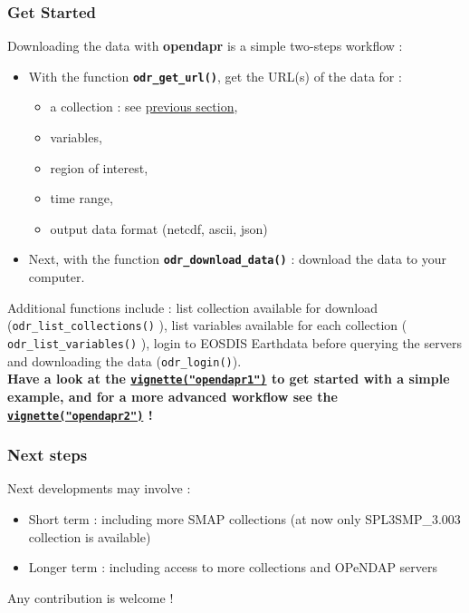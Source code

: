 \documentclass[12pt,twoside]{reedthesis}
\providecommand{\tightlist}{%
  \setlength{\itemsep}{0pt}\setlength{\parskip}{0pt}}
\begin{document}
\hypertarget{get-started}{%
\subsubsection{Get Started}\label{get-started}}

Downloading the data with \textbf{opendapr} is a simple two-steps workflow :
\begin{itemize}
\item
  With the function \textbf{\texttt{odr\_get\_url()}}, get the URL(s) of the data for :
  \begin{itemize}
  \tightlist
  \item
    a collection : see \protect\hyperlink{collections-available-in-opendapr}{previous section},
  \item
    variables,
  \item
    region of interest,
  \item
    time range,
  \item
    output data format (netcdf, ascii, json)
  \end{itemize}
\item
  Next, with the function \textbf{\texttt{odr\_download\_data()}} : download the data to your computer.
\end{itemize}
Additional functions include : list collection available for download (\texttt{odr\_list\_collections()} ), list variables available for each collection ( \texttt{odr\_list\_variables()} ), login to EOSDIS Earthdata before querying the servers and downloading the data (\texttt{odr\_login()}).\\

\textbf{Have a look at the \href{https://ptaconet.github.io/opendapr/articles/opendapr1.html}{\texttt{vignette("opendapr1")}} to get started with a simple example, and for a more advanced workflow see the \href{https://ptaconet.github.io/opendapr/articles/opendapr2.html}{\texttt{vignette("opendapr2")}} !}

\hypertarget{next-steps}{%
\subsubsection{Next steps}\label{next-steps}}

Next developments may involve :
\begin{itemize}
\tightlist
\item
  Short term : including more SMAP collections (at now only SPL3SMP\_3.003 collection is available)
\item
  Longer term : including access to more collections and OPeNDAP servers
\end{itemize}
Any contribution is welcome !
\end{document}

